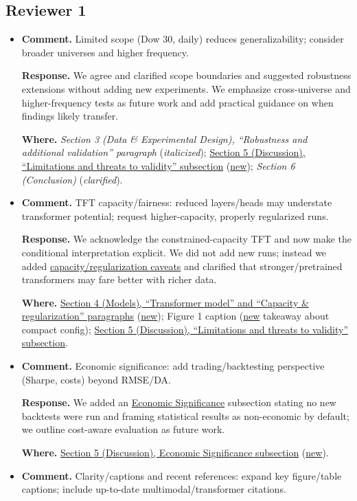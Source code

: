 \documentclass[11pt]{article}
\begin{document}
\subsection*{Reviewer 1}
\begin{itemize}[leftmargin=1.2em]
  \item \textbf{Comment.} Limited scope (Dow 30, daily) reduces generalizability; consider broader universes and higher frequency.
  
  \textbf{Response.} We agree and clarified scope boundaries and suggested robustness extensions without adding new experiments. We emphasize cross-universe and higher-frequency tests as future work and add practical guidance on when findings likely transfer.
  
  \textbf{Where.} \emph{Section 3 (Data \& Experimental Design), ``Robustness and additional validation'' paragraph} (\emph{italicized}); \uline{Section 5 (Discussion), ``Limitations and threats to validity'' subsection} (\uline{new}); \emph{Section 6 (Conclusion)} (\emph{clarified}).

  \item \textbf{Comment.} TFT capacity/fairness: reduced layers/heads may understate transformer potential; request higher-capacity, properly regularized runs.

  \textbf{Response.} We acknowledge the constrained-capacity TFT and now make the conditional interpretation explicit. We did not add new runs; instead we added \uline{capacity/regularization caveats} and clarified that stronger/pretrained transformers may fare better with richer data.

  \textbf{Where.} \uline{Section 4 (Models), ``Transformer model'' and ``Capacity \& regularization'' paragraphs} (\uline{new}); Figure 1 caption (\uline{new} takeaway about compact config); \uline{Section 5 (Discussion), ``Limitations and threats to validity'' subsection}.

  \item \textbf{Comment.} Economic significance: add trading/backtesting perspective (Sharpe, costs) beyond RMSE/DA.
  
  \textbf{Response.} We added an \underline{Economic Significance} subsection stating no new backtests were run and framing statistical results as non-economic by default; we outline cost-aware evaluation as future work.

  	\textbf{Where.} \uline{Section 5 (Discussion), Economic Significance subsection} (\uline{new}).

  \item \textbf{Comment.} Clarity/captions and recent references: expand key figure/table captions; include up-to-date multimodal/transformer citations.
  

\end{itemize}
\end{document}
